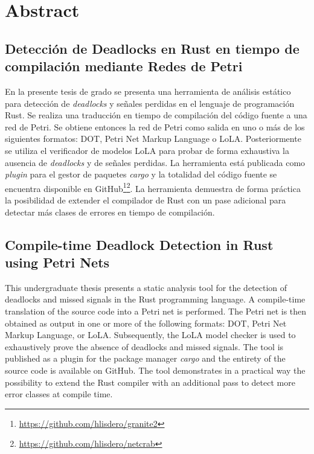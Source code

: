 \clearpage
{}
\chapter*{\centering Abstract}

\section*{Detección de Deadlocks en Rust en tiempo de compilación mediante Redes de Petri}

En la presente tesis de grado se presenta una herramienta de análisis estático
para detección de \textit{deadlocks} y señales perdidas en el lenguaje de programación Rust.
Se realiza una traducción en tiempo de compilación del código fuente a una red de Petri.
Se obtiene entonces la red de Petri como salida en uno o más de los siguientes formatos:
DOT, Petri Net Markup Language o \acrshort{LoLA}.
Posteriormente se utiliza el verificador de modelos \acrshort{LoLA}
para probar de forma exhaustiva la ausencia de \textit{deadlocks} y de señales perdidas.
La herramienta está publicada como \textit{plugin} para el gestor de paquetes \textit{cargo}
y la totalidad del código fuente se encuentra disponible
en GitHub\footnote{\url{https://github.com/hlisdero/granite2}}\footnote{\url{https://github.com/hlisdero/netcrab}}.
La herramienta demuestra de forma práctica la posibilidad
de extender el compilador de Rust con un pase adicional para
detectar más clases de errores en tiempo de compilación.

\section*{Compile-time Deadlock Detection in Rust using Petri Nets}

This undergraduate thesis presents a static analysis tool
for the detection of deadlocks and missed signals in the Rust programming language.
A compile-time translation of the source code into a Petri net is performed.
The Petri net is then obtained as output in one or more of the following formats:
DOT, Petri Net Markup Language, or \acrshort{LoLA}.
Subsequently, the \acrshort{LoLA} model checker is used
to exhaustively prove the absence of deadlocks and missed signals.
The tool is published as a plugin for the package manager \textit{cargo} and
the entirety of the source code is available on GitHub\footnotemark[1]\footnotemark[2].
The tool demonstrates in a practical way the possibility
to extend the Rust compiler with an additional pass
to detect more error classes at compile time.
